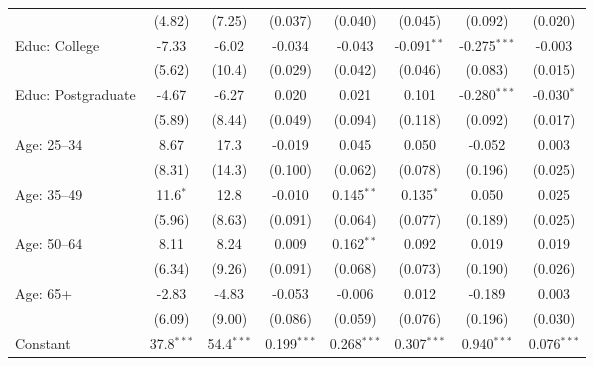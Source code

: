 \begin{adjustbox}{width = \textwidth, center}
\begin{tabular}{lccccccc}
                              & (4.82)        & (7.25)            & (0.037)       & (0.040)           & (0.045)       & (0.092)        & (0.020)\\   
      Educ: College           & -7.33         & -6.02             & -0.034        & -0.043            & -0.091$^{**}$ & -0.275$^{***}$ & -0.003\\   
                              & (5.62)        & (10.4)            & (0.029)       & (0.042)           & (0.046)       & (0.083)        & (0.015)\\   
      Educ: Postgraduate      & -4.67         & -6.27             & 0.020         & 0.021             & 0.101         & -0.280$^{***}$ & -0.030$^{*}$\\   
                              & (5.89)        & (8.44)            & (0.049)       & (0.094)           & (0.118)       & (0.092)        & (0.017)\\   
      Age: 25--34             & 8.67          & 17.3              & -0.019        & 0.045             & 0.050         & -0.052         & 0.003\\   
                              & (8.31)        & (14.3)            & (0.100)       & (0.062)           & (0.078)       & (0.196)        & (0.025)\\   
      Age: 35--49             & 11.6$^{*}$    & 12.8              & -0.010        & 0.145$^{**}$      & 0.135$^{*}$   & 0.050          & 0.025\\   
                              & (5.96)        & (8.63)            & (0.091)       & (0.064)           & (0.077)       & (0.189)        & (0.025)\\   
      Age: 50--64             & 8.11          & 8.24              & 0.009         & 0.162$^{**}$      & 0.092         & 0.019          & 0.019\\   
                              & (6.34)        & (9.26)            & (0.091)       & (0.068)           & (0.073)       & (0.190)        & (0.026)\\   
      Age: 65+                & -2.83         & -4.83             & -0.053        & -0.006            & 0.012         & -0.189         & 0.003\\   
                              & (6.09)        & (9.00)            & (0.086)       & (0.059)           & (0.076)       & (0.196)        & (0.030)\\   
      Constant                & 37.8$^{***}$  & 54.4$^{***}$      & 0.199$^{***}$ & 0.268$^{***}$     & 0.307$^{***}$ & 0.940$^{***}$  & 0.076$^{***}$\\   

\end{tabular}
\end{adjustbox}
